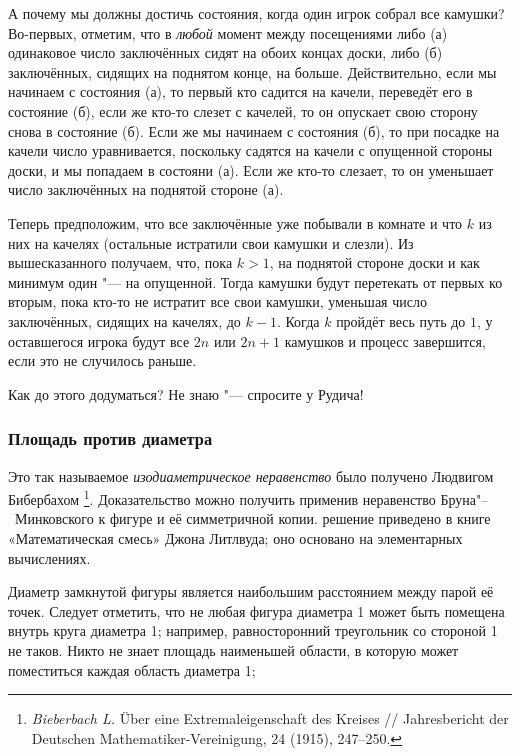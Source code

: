 \documentclass[twoside]{book}
\begin{document}
А почему мы должны достичь состояния, когда один игрок собрал все камушки?
Во-первых, отметим, что в \emph{любой} момент между посещениями либо 
(а) одинаковое число заключённых сидят на обоих концах доски, либо 
(б) заключённых, сидящих на поднятом конце, на  больше.
Действительно, если мы начинаем с состояния (а), то первый кто садится на качели, переведёт его в состояние (б), если же кто-то слезет с качелей, то он опускает свою сторону  снова  в состояние (б).
Если же мы начинаем с состояния (б), то при посадке на качели число уравнивается, поскольку садятся на качели с опущенной стороны доски, и мы попадаем в состояни (а).
Если же кто-то слезает, то он уменьшает число заключённых на поднятой стороне (а).

Теперь предположим, что все заключённые уже побывали в комнате и что $k$ из них на качелях (остальные истратили свои камушки и слезли).
Из вышесказанного получаем, что, пока $k>1$,  на поднятой стороне доски и как минимум один "--- на опущенной.
Тогда камушки будут перетекать от первых ко вторым, пока кто-то не истратит все свои камушки, уменьшая число заключённых, сидящих на качелях, до $k-1$.
Когда $k$ пройдёт весь путь до $1$, у оставшегося игрока будут все $2n$ или $2n+1$ камушков и процесс завершится, если это не случилось раньше.
\heart

Как до этого додуматься?
Не  знаю "--- спросите у Рудича!

\subsubsection*{Площадь против диаметра}

Это так называемое \emph{изодиаметрическое неравенство} было получено Людвигом Бибербахом%
\footnote{\emph{Bieberbach L.} Über eine Extremaleigenschaft des Kreises /\!/ {Jahresbericht der Deutschen Mathematiker-Vereinigung}, 24 (1915), 247--250.}.
Доказательство можно получить применив неравенство Бруна"--~Минковского к фигуре и её симметричной копии.
 решение приведено в книге «Математическая смесь» Джона Литлвуда; оно основано на элементарных вычислениях.


Диаметр замкнутой фигуры является наибольшим расстоянием между парой её точек.
Следует отметить, что не любая фигура диаметра 1 может быть помещена внутрь круга диаметра 1;
например, равносторонний треугольник со стороной 1 не таков.
Никто не знает площадь наименьшей области, в которую может поместиться каждая область диаметра 1; 
\end{document}
